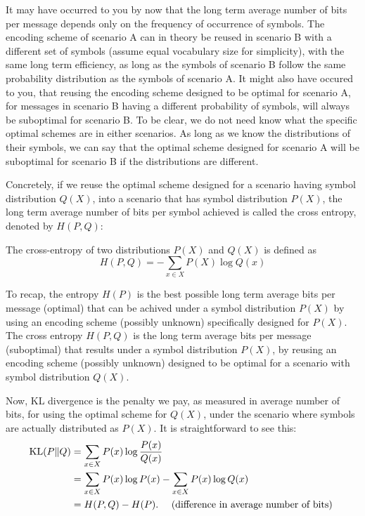 \documentclass[a4paper]{article}
\begin{document}
It may have occurred to you by now that the long term average 
number of bits per message depends only on the frequency of 
occurrence of symbols. The encoding scheme of scenario A can 
in theory be reused in scenario B with a different set of 
symbols (assume equal vocabulary size for simplicity), 
with the same long term efficiency, as long as the symbols 
of scenario B follow the same probability distribution as the 
symbols of scenario A. It might also have occured to you, 
that reusing the encoding scheme designed to be optimal for 
scenario A, for messages in scenario B having a different 
probability of symbols, will always be suboptimal for 
scenario B. To be clear, we do not need know what the 
specific optimal schemes are in either scenarios. As long 
as we know the distributions of their symbols, we can say 
that the optimal scheme designed for scenario A will be 
suboptimal for scenario B if the distributions are different.

Concretely, if we reuse the optimal scheme designed for a 
scenario having symbol distribution $Q(X)$, into a scenario 
that has symbol distribution $P(X)$, the long term average 
number of bits per symbol achieved is called the cross entropy, 
denoted by $H(P,Q)$:

\begin{defi}
  The cross-entropy of two distributions $P(X)$
  and $Q(X)$ is defined as 
  \[
  H(P, Q) = - \sum_{x \in X} P(X) \log Q(x) 
  \]
\end{defi}

To recap, the entropy $H(P)$ is the best possible long term 
average bits per message (optimal) that can be achived under 
a symbol distribution $P(X)$ by using an encoding scheme 
(possibly unknown) specifically designed for $P(X)$. 
The cross entropy $H(P,Q)$ is the long term average bits 
per message (suboptimal) that results under a symbol 
distribution $P(X)$, by reusing an encoding scheme 
(possibly unknown) designed to be optimal for a scenario 
with symbol distribution $Q(X)$.

Now, KL divergence is the penalty we pay, as measured in 
average number of bits, for using the optimal scheme for 
$Q(X)$, under the scenario where symbols are actually 
distributed as $P(X)$. It is straightforward to see this:
\[
\begin{aligned}
  \operatorname{KL}(P \Vert Q) 
  &= \sum_{x \in X} P(x) \log \frac{P(x)}{Q(x)} \\
  &= \sum_{x \in X} P(x) \log P(x) - \sum_{x \in X} 
  P(x) \log Q(x) \\
  &= H(P, Q) - H(P). 
  \quad \text{ (difference in average number of bits) }
\end{aligned}
\]
\end{document}
